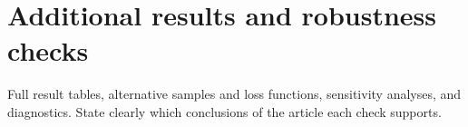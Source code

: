 \chapter{Additional results and robustness checks}

Full result tables, alternative samples and loss functions, sensitivity analyses, and diagnostics. State clearly which conclusions of the article each check supports.
